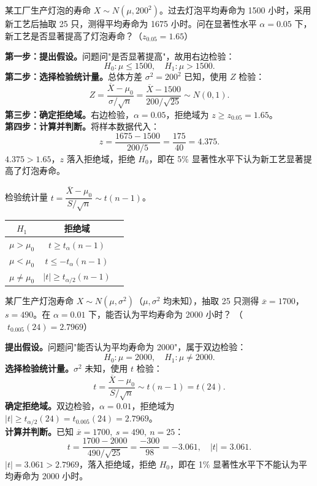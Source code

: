 \documentclass[lang=cn,11pt]{elegantbook}
\begin{document}
\begin{exercise}\label{exer:9-z-test}
某工厂生产灯泡的寿命 \(X \sim N(\mu, 200^2)\)。过去灯泡平均寿命为 1500 小时，采用新工艺后抽取 25 只，测得平均寿命为 1675 小时。问在显著性水平 \(\alpha = 0.05\) 下，新工艺是否显著提高了灯泡寿命？（\(z_{0.05}=1.65\)）
\end{exercise}
\begin{solution}
\textbf{第一步：提出假设。}问题问"是否显著提高"，故用右边检验：
\[
H_0\colon \mu \leq 1500,\quad H_1\colon \mu > 1500.
\]
\textbf{第二步：选择检验统计量。}总体方差 \(\sigma^2=200^2\) 已知，使用 \(Z\) 检验：
\[
Z = \frac{\overline{X}-\mu_0}{\sigma/\sqrt{n}} = \frac{\overline{X}-1500}{200/\sqrt{25}} \sim N(0,1).
\]
\textbf{第三步：确定拒绝域。}右边检验，\(\alpha=0.05\)，拒绝域为 \(z \geq z_{0.05}=1.65\)。\\
\textbf{第四步：计算并判断。}将样本数据代入：
\[
z = \frac{1675-1500}{200/5} = \frac{175}{40} = 4.375.
\]
\(4.375 > 1.65\)，\(z\) 落入拒绝域，拒绝 \(H_0\)，即在 5\% 显著性水平下认为新工艺显著提高了灯泡寿命。
\end{solution}


\begin{property}[t 检验（\(\sigma^2\) 未知）]\label{prop:t-test}
检验统计量 \(t = \dfrac{\overline{X}-\mu_0}{S/\sqrt{n}} \sim t(n-1)\)。
\begin{center}
\begin{tabular}{ccc}
\toprule
\(H_1\) & 拒绝域 \\
\midrule
\(\mu > \mu_0\) & \(t \geq t_\alpha(n-1)\) \\[4pt]
\(\mu < \mu_0\) & \(t \leq -t_\alpha(n-1)\) \\[4pt]
\(\mu \neq \mu_0\) & \(|t| \geq t_{\alpha/2}(n-1)\) \\
\bottomrule
\end{tabular}
\end{center}
\end{property}


\begin{exercise}\label{exer:9-t-test-two}
某厂生产灯泡寿命 \(X \sim N(\mu, \sigma^2)\)（\(\mu, \sigma^2\) 均未知），抽取 25 只测得 \(\overline{x}=1700\)，\(s=490\)。在 \(\alpha=0.01\) 下，能否认为平均寿命为 2000 小时？
（\(\;t_{0.005}(24)=2.7969\)）
\end{exercise}
\begin{solution}
\textbf{提出假设。}问题问"能否认为平均寿命为 2000"，属于双边检验：
\[
H_0\colon \mu = 2000,\quad H_1\colon \mu \neq 2000.
\]
\textbf{选择检验统计量。}\(\sigma^2\) 未知，使用 \(t\) 检验：
\[
t = \frac{\overline{X}-\mu_0}{S/\sqrt{n}} \sim t(n-1) = t(24).
\]
\textbf{确定拒绝域。}双边检验，\(\alpha=0.01\)，拒绝域为 \(|t| \geq t_{\alpha/2}(24) = t_{0.005}(24)=2.7969\)。\\
\textbf{计算并判断。}已知 \(\overline{x}=1700,\ s=490,\ n=25\)：
\[
t = \frac{1700-2000}{490/\sqrt{25}} = \frac{-300}{98} = -3.061,\quad |t| = 3.061.
\]
\(|t| = 3.061 > 2.7969\)，落入拒绝域，拒绝 \(H_0\)，即在 1\% 显著性水平下不能认为平均寿命为 2000 小时。
\end{solution}
\end{document}
